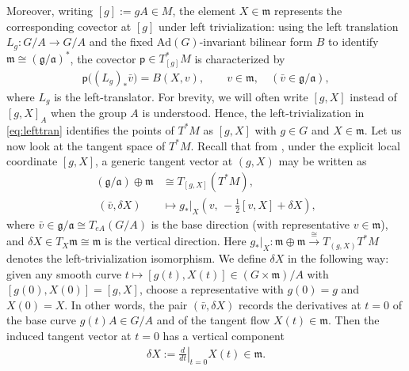 \documentclass[11pt]{amsart}
\theoremstyle{definition}
\theoremstyle{plain}
\theoremstyle{conclusion}
\begin{document}
Moreover, writing $[g]:=gA\in M$, the element $X\in\mathfrak{m}$ represents the corresponding covector at $[g]$ under left trivialization: using the left translation $L_g:G/A \rightarrow G/A$ and the fixed $\mathrm{Ad}(G)$-invariant bilinear form $B$ to identify $\mathfrak{m}\cong (\mathfrak{g}/\mathfrak{a})^*$, the covector $\mathsf{p}\in T^*_{[g]}M$ is characterized by
\begin{align*}
\mathsf{p}\bigl((L_g)_*\bar{v}\bigr) = B(X,v),\qquad v\in\mathfrak{m}, \quad (\bar{v}\in \mathfrak{g}/\mathfrak{a}),
\end{align*} where $L_g$ is the left-translator.
For brevity, we will often write $[g,X]$ instead of $[g,X]_A$ when the group $A$ is understood. Hence, the left-trivialization in \eqref{eq:lefttran} identifies the points of $T^*M$ as $[g,X]$ with $g \in G$ and $X \in \mathfrak{m}$. Let us now look at the tangent space of $T^*M$.  %
Recall that from \cite{MR2141306}, under the explicit local coordinate $[g,X]$, a generic tangent vector at $(g,X)$ may be written as\begin{align}
\nonumber (\mathfrak{g}/\mathfrak{a})\oplus \mathfrak{m} & \cong   T_{[g,X]}(T^*M),\\
   \ (\bar{v},\delta X)&\longmapsto  g_*\big\vert_X \left(v,\,-\frac12[v,X]+\delta X\right)  , \label{eq:coordinate01}
\end{align} where $\bar{v} \in \mathfrak{g}/\mathfrak{a} \cong T_{eA}(G/A)$ is the base direction (with representative $v\in\mathfrak{m}$), and $\delta X\in T_X\mathfrak{m}\cong \mathfrak{m}$ is the vertical direction. Here $g_*\vert_X : \mathfrak{m} \oplus \mathfrak{m} \xrightarrow{\ \cong \ } T_{(g,X)}T^*M$ denotes the left-trivialization isomorphism. We define $\delta X$ in the following way: given any smooth curve $t\mapsto [g(t),X(t)]\in (G\times \mathfrak{m})/A$ with $[g(0),X(0)]=[g,X]$, choose a representative with $g(0)=g$ and $X(0)=X$. In other words, the pair $(\bar{v},\delta X)$ records the derivatives at $t=0$ of the base curve $g(t)A\in G/A$ and of the tangent flow $X(t) \in \mathfrak{m}$. Then the induced tangent vector at $t=0$ has a vertical component \begin{align*}
\delta X:=\left.\frac{d}{dt}\right\vert_{t=0} X(t)\in \mathfrak{m}.
\end{align*}
\end{document}
